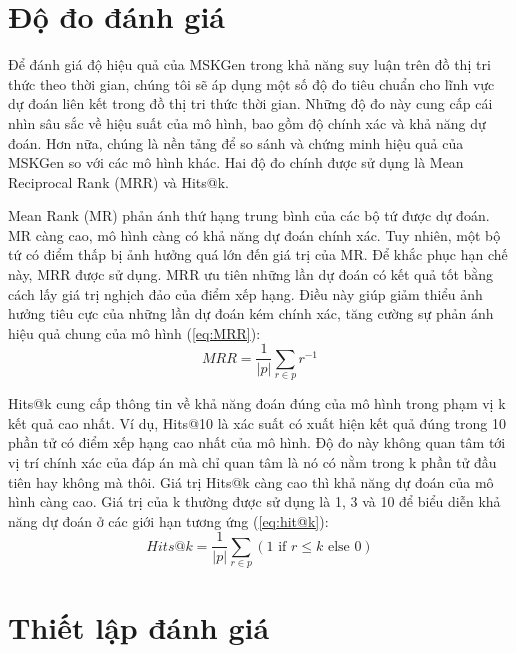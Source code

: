 \section{Độ đo đánh giá}
Để đánh giá độ hiệu quả của MSKGen trong khả năng suy luận trên đồ thị tri thức theo thời gian, chúng tôi sẽ áp dụng một số độ đo tiêu chuẩn cho lĩnh vực dự đoán liên kết trong đồ thị tri thức thời gian. Những độ đo này cung cấp cái nhìn sâu sắc về hiệu suất của mô hình, bao gồm độ chính xác và khả năng dự đoán. Hơn nữa, chúng là nền tảng để so sánh và chứng minh hiệu quả của MSKGen so với các mô hình khác. Hai độ đo chính được sử dụng là Mean Reciprocal Rank (MRR) và Hits@k.

Mean Rank (MR) phản ánh thứ hạng trung bình của các bộ tứ được dự đoán. MR càng cao, mô hình càng có khả năng dự đoán chính xác. Tuy
nhiên, một bộ tứ có điểm thấp bị ảnh hưởng quá lớn đến giá trị của MR. Để khắc phục hạn chế này, MRR được sử dụng. MRR ưu tiên những lần 
dự đoán có kết quả tốt bằng cách lấy giá trị nghịch đảo của điểm xếp hạng. Điều này giúp giảm thiểu ảnh hưởng tiêu cực của những lần dự đoán kém 
chính xác, tăng cường sự phản ánh hiệu quả chung của mô hình (\ref{eq:MRR}):
\begin{equation}
    \label{eq:MRR}
    MRR = \frac{1}{|p|} \sum_{r \in p} r^{-1}
\end{equation}

Hits@k cung cấp thông tin về khả năng đoán đúng của mô hình trong phạm vị k kết quả cao nhất. Ví dụ, Hits@10 là xác suất có xuất hiện kết quả đúng trong 10 phần tử có điểm xếp hạng cao nhất của mô hình. Độ đo này không quan tâm tới vị trí chính xác của đáp án mà chỉ quan tâm là nó có nằm trong k phần tử đầu tiên hay không mà thôi. Giá trị Hits@k càng cao thì khả năng dự đoán của mô hình càng cao. Giá trị của k thường được sử dụng là 1, 3 và 10 để biểu diễn khả năng dự đoán ở các giới hạn tương ứng (\ref{eq:hit@k}):
\begin{equation}
    \label{eq:hit@k}
    Hits@k = \frac{1}{|p|} \sum_{r \in p} (1 \text{ if } r \leq k \text{ else } 0)
\end{equation}

\section{Thiết lập đánh giá}

